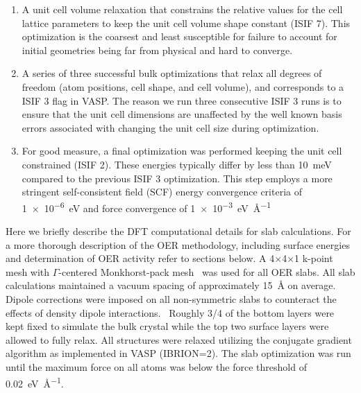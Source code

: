 \begin{enumerate}
  \item
  A unit cell volume relaxation that constrains the relative values for the cell lattice parameters to keep the unit cell volume shape constant (ISIF 7).
  This optimization is the coarsest and least susceptible for failure to account for initial geometries being far from physical and hard to converge.
  \item
  A series of three successful bulk optimizations that relax all degrees of freedom (atom positions, cell shape, and cell volume),
  and corresponds to a ISIF \num{3} flag in VASP.
  The reason we run three consecutive ISIF \num{3} runs is to ensure that the unit cell dimensions are unaffected by the well known basis errors associated with changing the unit cell size during optimization.
  \item
  For good measure, a final optimization was performed keeping the unit cell constrained (ISIF \num{2}).
  These energies typically differ by less than \SI{10}{\milli\electronvolt} compared to the previous ISIF 3 optimization.
  This step employs a more stringent self-consistent field (SCF) energy convergence criteria of \SI{1e-6}{\electronvolt} and force convergence of \SI{1e-3}{\electronvolt\per\angstrom}
\end{enumerate}
%
Here we briefly describe the DFT computational details for slab calculations.
%
For a more thorough description of the OER methodology, including surface energies and determination of OER activity refer to sections below.
%
A 4$\times$4$\times$1 k-point mesh with $\Gamma$-centered Monkhorst-pack mesh~\cite{Monkhorst1976} was used for all OER slabs.
%
All slab calculations maintained a vacuum spacing of approximately \SI{15}{\angstrom} on average.
%
Dipole corrections were imposed on all non-symmetric slabs to counteract the effects of density dipole interactions.~\cite{Neugebauer1992}
%
Roughly \num{3/4} of the bottom layers were kept fixed to simulate the bulk crystal while the top two surface layers were allowed to fully relax.
%
All structures were relaxed utilizing the conjugate gradient algorithm as implemented in VASP (IBRION\num{=2}).
%
The slab optimization was run until the maximum force on all atoms was below the force threshold of \SI{0.02}{\electronvolt\per\angstrom}.

